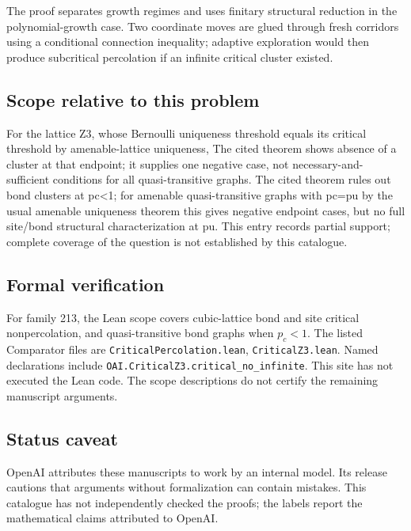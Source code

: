 \documentclass[11pt]{article}
\begin{document}
The proof separates growth regimes and uses finitary structural reduction in the polynomial-growth case. Two coordinate moves are glued through fresh corridors using a conditional connection inequality; adaptive exploration would then produce subcritical percolation if an infinite critical cluster existed.

\subsection{Scope relative to this problem}
For the lattice Z3, whose Bernoulli uniqueness threshold equals its critical threshold by amenable-lattice uniqueness, The cited theorem shows absence of a cluster at that endpoint; it supplies one negative case, not necessary-and-sufficient conditions for all quasi-transitive graphs. The cited theorem rules out bond clusters at pc<1; for amenable quasi-transitive graphs with pc=pu by the usual amenable uniqueness theorem this gives negative endpoint cases, but no full site/bond structural characterization at pu. This entry records partial support; complete coverage of the question is not established by this catalogue.

\subsection{Formal verification}
For family 213, the Lean scope covers cubic-lattice bond and site critical nonpercolation, and quasi-transitive bond graphs when $p_c<1$. The listed Comparator files are \texttt{CriticalPercolation.lean}, \texttt{CriticalZ3.lean}. Named declarations include \texttt{OAI.CriticalZ3.critical\_no\_infinite}. This site has not executed the Lean code. The scope descriptions do not certify the remaining manuscript arguments.

\subsection{Status caveat}
OpenAI attributes these manuscripts to work by an internal model. Its release cautions that arguments without formalization can contain mistakes. This catalogue has not independently checked the proofs; the labels report the mathematical claims attributed to OpenAI.
\end{document}
